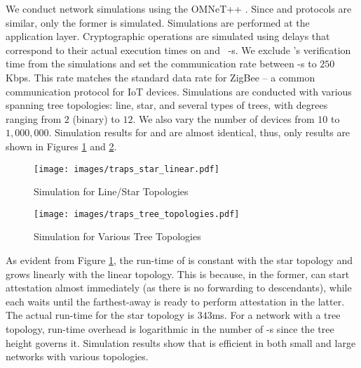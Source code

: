 We conduct network simulations using the OMNeT++ \cite{omnetpp}. %
Since \trapsrtc and \trapsnortc protocols are similar, only the former is simulated.
Simulations are performed at the application layer. Cryptographic operations are simulated using delays 
that correspond to their actual execution times on \trapscasu and \trapsrata\ \prv-s.
We exclude \vrf's verification time from the simulations and set the communication rate between \prv-s to $250$Kbps.
This rate matches the standard data rate for ZigBee -- a common communication protocol for IoT devices.
Simulations are conducted with various spanning tree topologies: line, star, and several types of trees, with degrees
ranging from $2$ (binary) to $12$. We also vary the number of devices from $10$ to $1,000,000$.
Simulation results for \trapscasu and \trapsrata are almost identical, thus, only \trapscasu results are shown in Figures \ref{fig: star linear} and \ref{fig: tree topologies}.

\begin{figure}
    \centering
    \captionsetup{justification=centering}
    \texttt{[image: images/traps\_star\_linear.pdf]}
    \caption{\system Simulation for Line/Star Topologies}
    \label{fig: star linear}
\end{figure}

\begin{figure}
    \centering
    \captionsetup{justification=centering}
    \texttt{[image: images/traps\_tree\_topologies.pdf]}
    \caption{\system Simulation for Various Tree Topologies} 
    \label{fig: tree topologies}
\end{figure}

As evident from Figure \ref{fig: star linear}, the run-time of \system is constant with the star topology and 
grows linearly with the linear topology.
This is because, in the former, \prv can start attestation almost immediately (as there is no forwarding to descendants), 
while each \prv waits until the farthest-away \prv is ready to perform attestation in the latter. 
The actual run-time for the star topology is $343$ms. For a network with a tree topology, 
\system run-time overhead is logarithmic in the number of \prv-s since the tree height governs it.
Simulation results show that \system is efficient in both small and large networks with various topologies. 